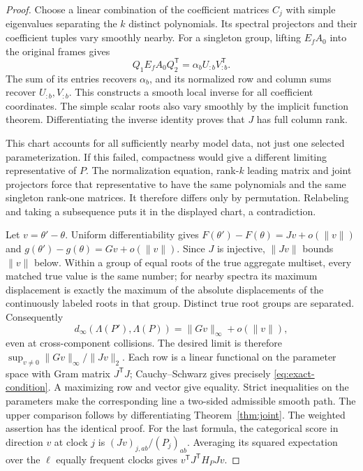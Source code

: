 \begin{proof}
Choose a linear combination of the coefficient matrices $C_j$ with
simple eigenvalues separating the $k$ distinct polynomials. Its
spectral projectors and their coefficient tuples vary smoothly nearby.
For a singleton group, lifting $E_fA_0$ into the original frames gives
\[
 Q_1E_fA_0Q_2^{\mathsf T}=\alpha_bU_{:b}V_{:b}^{\mathsf T}.
\]
The sum of its entries recovers $\alpha_b$, and its normalized row
and column sums recover $U_{:b},V_{:b}$. This constructs a smooth local
inverse for all coefficient coordinates. The simple scalar roots also
vary smoothly by the implicit function theorem. Differentiating the
inverse identity proves that $J$ has full column rank.

This chart accounts for all sufficiently nearby model data, not just
one selected parameterization. If this failed, compactness would give
a different limiting representative of $P$. The normalization equation,
rank-$k$ leading matrix and joint projectors force that representative
to have the same polynomials and the same singleton rank-one matrices.
It therefore differs only by permutation. Relabeling and taking a
subsequence puts it in the displayed chart, a contradiction.

Let $v=\theta'-\theta$. Uniform differentiability gives
$F(\theta')-F(\theta)=Jv+o(\|v\|)$ and
$g(\theta')-g(\theta)=Gv+o(\|v\|)$. Since $J$ is injective,
$\|Jv\|$ bounds $\|v\|$ below. Within a group of equal roots of the
true aggregate multiset, every matched true value is the same number;
for nearby spectra its maximum displacement is exactly the maximum
of the absolute displacements of the continuously labeled roots in
that group. Distinct true root groups are separated. Consequently
\[
 d_\infty(\Lambda(P'),\Lambda(P))=\|Gv\|_\infty+o(\|v\|),
\]
even at cross-component collisions. The desired limit is therefore
$\sup_{v\ne0}\|Gv\|_\infty/\|Jv\|_2$. Each row is a linear
functional on the parameter space with Gram matrix $J^{\mathsf T}J$;
Cauchy--Schwarz gives precisely \eqref{eq:exact-condition}. A maximizing
row and vector give equality. Strict inequalities on the parameters
make the corresponding line a two-sided admissible smooth path.
The upper comparison follows by differentiating Theorem~\ref{thm:joint}.
The weighted assertion has the identical proof. For the last formula,
the categorical score in direction $v$ at clock $j$ is
$(Jv)_{j,ab}/(P_j)_{ab}$. Averaging its squared expectation over the
$\ell$ equally frequent clocks gives $v^{\mathsf T}J^{\mathsf T}H_PJv$.
\end{proof}

